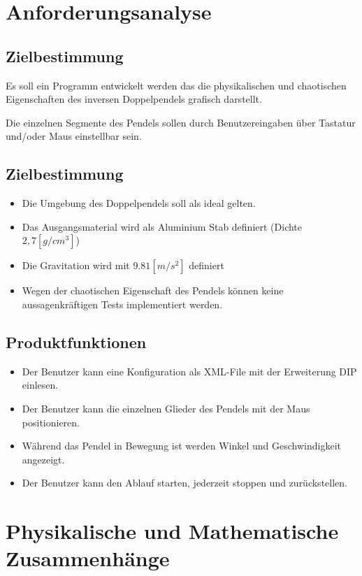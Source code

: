 \documentclass[12pt]{article}
\numberwithin{equation}{subsection}
\begin{document}
\newpage
\section{Anforderungsanalyse}
\subsection{Zielbestimmung}
Es soll ein Programm entwickelt werden das die physikalischen und chaotischen Eigenschaften des inversen Doppelpendels grafisch darstellt.

Die einzelnen Segmente des Pendels sollen durch Benutzereingaben über Tastatur und/oder Maus einstellbar sein.

\subsection{Zielbestimmung}
\begin{itemize}
	\item Die Umgebung des Doppelpendels soll als ideal gelten.
	\item Das Ausgangsmaterial wird als Aluminium Stab definiert (Dichte $2,7 [g/cm^3]$)
	\item Die Gravitation wird mit $9.81 [m/s^2]$ definiert
	\item Wegen der chaotischen Eigenschaft des Pendels können keine aussagenkräftigen Tests implementiert werden.
\end{itemize}

\subsection{Produktfunktionen}
\begin{itemize}
	\item Der Benutzer kann eine Konfiguration als XML-File mit der Erweiterung DIP einlesen.
	\item Der Benutzer kann die einzelnen Glieder des Pendels mit der Maus positionieren.
	\item Während das Pendel in Bewegung ist werden Winkel und Geschwindigkeit angezeigt.
	\item Der Benutzer kann den Ablauf starten, jederzeit stoppen und zurückstellen.
\end{itemize}

\newpage
\section{Physikalische und Mathematische Zusammenhänge}
\end{document}
